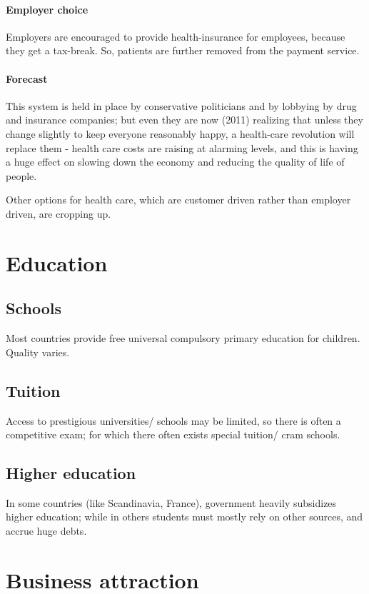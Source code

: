 \documentclass[oneside, article]{memoir}
\begin{document}
\paragraph{Employer choice}
Employers are encouraged to provide health-insurance for employees, because they get a tax-break. So, patients are further removed from the payment service.

\paragraph{Forecast}
This system is held in place by conservative politicians and by lobbying by drug and insurance companies; but even they are now (2011) realizing that unless they change slightly to keep everyone reasonably happy, a health-care revolution will replace them - health care costs are raising at alarming levels, and this is having a huge effect on slowing down the economy and reducing the quality of life of people.

Other options for health care, which are customer driven rather than employer driven, are cropping up.

\section{Education}
\subsection{Schools}
Most countries provide free universal compulsory primary education for children. Quality varies.

\subsection{Tuition}
Access to prestigious universities/ schools may be limited, so there is often a competitive exam; for which there often exists special tuition/ cram schools.

\subsection{Higher education}
In some countries (like Scandinavia, France), government heavily subsidizes higher education; while in others students must mostly rely on other sources, and accrue huge debts.

\section{Business attraction}
\end{document}

